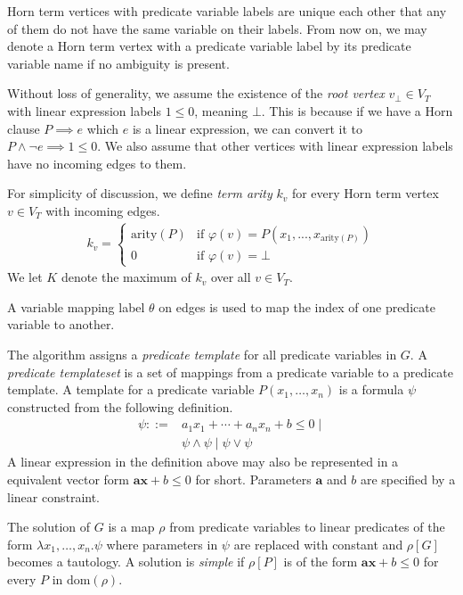 Horn term vertices with predicate variable labels are unique each
other that any of them do not have the same variable on their labels.
From now on, we may denote a Horn term vertex with a predicate
variable label by its predicate variable name if no ambiguity is
present.

Without loss of generality, we assume the existence of the
\emph{root vertex} $v_\bot \in V_T$ with linear expression labels
$1 \leq 0$, meaning $\bot$.  This is because if we have a Horn clause
$P \implies e$ which $e$ is a linear expression, we can convert it to
$P \wedge \neg e \implies 1 \leq 0$.  We also assume that other
vertices with linear expression labels have no incoming edges to them.

For simplicity of discussion, we define \emph{term arity} $k_v$ for
every Horn term vertex $v \in V_T$ with incoming edges.
\begin{align*}
k_v =
\begin{cases}
\mathrm{arity}(P) & \mbox{if } \varphi(v) = P(x_1,...,x_{\mathrm{arity}(P)}) \\
0 & \mbox{if } \varphi(v) = \bot
\end{cases}
\end{align*}
We let $K$ denote the maximum of $k_v$ over all $v \in V_T$.

A variable mapping label $\theta$ on edges is used to map the index of
one predicate variable to another.

The algorithm assigns a \emph{predicate template} for all predicate
variables in $G$. A \emph{predicate templateset} is a set of mappings
from a predicate variable to a predicate template.  A template for a
predicate variable $P(x_1, \ldots, x_n)$ is a formula $\psi$
constructed from the following definition.
\begin{align*}
\psi ::= & a_1 x_1 + \cdots + a_n x_n + b \leq 0 \mid \\
& \psi \wedge \psi \mid \psi \vee \psi
\end{align*}
A linear expression in the definition above may also be represented in
a equivalent vector form $\mathbf{a} \mathbf{x} + b \leq 0$ for short.
Parameters $\mathbf{a}$ and $b$ are specified by a linear constraint.

The solution of $G$ is a map $\rho$ from predicate variables to linear
predicates of the form $\lambda x_1, \ldots ,x_n. \psi$ where
parameters in $\psi$ are replaced with constant and $\rho[G]$ becomes
a tautology.  A solution is \textit{simple} if $\rho[P]$ is of the
form $\mathbf{a} \mathbf{x} + b \leq 0$ for every $P$ in
$\mathrm{dom}(\rho)$.

